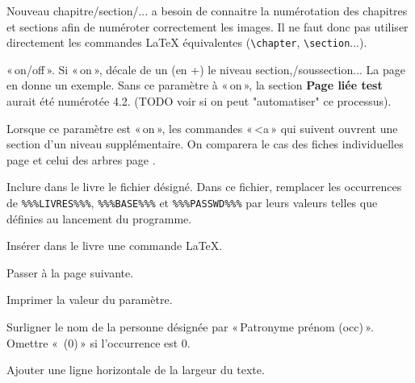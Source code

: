 \begin{description}[style=nextline]
\item[Chapter/Section/SubSection/SubSubSection] Nouveau chapitre/section/...
\gwtol{} a besoin de connaitre la numérotation des chapitres et sections afin
de numéroter correctement les images. Il ne faut donc pas utiliser directement
les commandes \LaTeX{} équivalentes (\verb|\chapter|, \verb|\section|...).
\item[BumpSub] «\,on/off\,». Si «\,on\,», décale de un (en +) le niveau
section,/soussection... La page \pageref{pageliee} en donne un exemple.
Sans ce paramètre à «\,on\,», la section {\bf Page liée test} aurait été
numérotée 4.2. (TODO voir si on peut "automatiser" ce processus).
\item[NewSection] Lorsque ce paramètre est «\,on\,», les commandes «\,<a\,»
qui suivent ouvrent une section d'un niveau supplémentaire. On comparera le cas
des fiches individuelles page \pageref{fiches} et celui des arbres page 
\pageref{relation}. 

\item[Input] Inclure dans le livre le fichier désigné. Dans ce fichier,
remplacer les occurrences de \verb|%%%LIVRES%%%|, \verb|%%%BASE%%%| et
\verb|%%%PASSWD%%%| par leurs valeurs telles que définies au lancement du programme.
\item[LaTeX] Insérer dans le livre une commande \LaTeX{}.
\item[Newpage] Passer à la page suivante.
\item[Print] Imprimer la valeur du paramètre.

\item[HighLight] Surligner le nom de la personne désignée par «\,Patronyme prénom (occ)\,».
Omettre «\, (0)\,» si l'occurrence est 0.
\item[Hrule] Ajouter une ligne horizontale de la largeur du texte.


\end{description}
